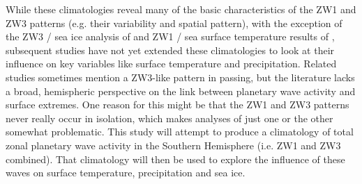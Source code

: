 While these climatologies reveal many of the basic characteristics of the ZW1 and ZW3 patterns (e.g. their variability and spatial pattern), with the exception of the ZW3 / sea ice analysis of \citet{Raphael2007} and ZW1 / sea surface temperature results of \citet{Hobbs2007}, subsequent studies have not yet extended these climatologies to look at their influence on key variables like surface temperature and precipitation. Related studies \citep[e.g. of Australian rainfall variability;][]{Frederiksen2014} sometimes mention a ZW3-like pattern in passing, but the literature lacks a broad, hemispheric perspective on the link between planetary wave activity and surface extremes. One reason for this might be that the ZW1 and ZW3 patterns never really occur in isolation, which makes analyses of just one or the other somewhat problematic. This study will attempt to produce a climatology of total zonal planetary wave activity in the Southern Hemisphere (i.e. ZW1 and ZW3 combined). That climatology will then be used to explore the influence of these waves on surface temperature, precipitation and sea ice.
